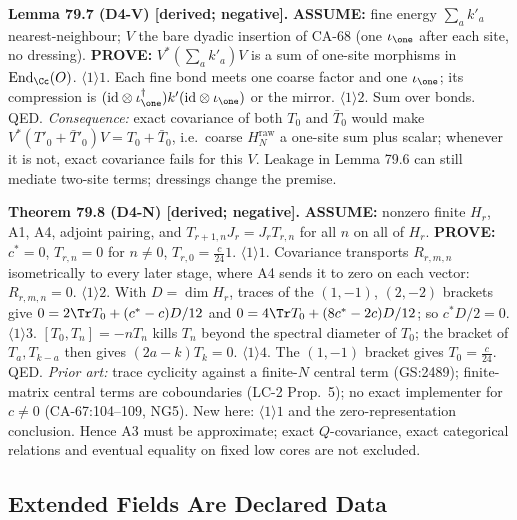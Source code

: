 \textbf{Lemma 79.7 (D4-V) [derived; negative].}  \textbf{ASSUME:} fine energy
\(\sum_ak'_a\) nearest-neighbour; \(V\) the bare dyadic insertion of CA-68 (one \(\iota_\one\) after each
site, no dressing).  \textbf{PROVE:} \(V^*(\sum_ak'_a)V\) is a sum of one-site morphisms in
\(\operatorname{End}_\Cc(O)\).  \(\langle1\rangle1\). Each fine bond meets one coarse factor and one
\(\iota_\one\); its compression is \((\mathrm{id}\otimes\iota_\one^\dagger)k'(\mathrm{id}\otimes\iota_\one)\) or
the mirror.  \(\langle1\rangle2\). Sum over bonds.  QED.  \emph{Consequence:} exact covariance of both
\(T_0\) and \(\bar T_0\) would make \(V^*(T'_0+\bar T'_0)V=T_0+\bar T_0\), i.e.\ coarse \(H^{\mathrm{raw}}_N\)
a one-site sum plus scalar; whenever it is not, exact covariance fails for this \(V\).
Leakage in Lemma 79.6 can still mediate two-site terms; dressings change the premise.

\textbf{Theorem 79.8 (D4-N) [derived; negative].}  \textbf{ASSUME:} nonzero finite \(H_r\), A1,
A4, adjoint pairing, and \(T_{r+1,n}J_r=J_rT_{r,n}\) for all \(n\) on all of \(H_r\).
\textbf{PROVE:} \(c^*=0\), \(T_{r,n}=0\) for \(n\ne0\), \(T_{r,0}=\frac c{24}1\).
\(\langle1\rangle1\). Covariance transports \(R_{r,m,n}\) isometrically to every later stage, where A4
sends it to zero on each vector: \(R_{r,m,n}=0\).  \(\langle1\rangle2\). With \(D=\dim H_r\), traces of
the \((1,-1)\), \((2,-2)\) brackets give \(0=2\Tr T_0+(c^*-c)D/12\) and \(0=4\Tr T_0+(8c^*-2c)D/12\);
so \(c^*D/2=0\).  \(\langle1\rangle3\). \([T_0,T_n]=-nT_n\) kills \(T_n\) beyond the spectral diameter
of \(T_0\); the bracket of \(T_a,T_{k-a}\) then gives \((2a-k)T_k=0\).  \(\langle1\rangle4\). The
\((1,-1)\) bracket gives \(T_0=\frac c{24}\).  QED.
\emph{Prior art:} trace cyclicity against a finite-\(N\) central term (GS:2489); finite-matrix
central terms are coboundaries (LC-2 Prop.~5); no exact implementer for \(c\ne0\) (CA-67:104--109,
NG5).  New here: \(\langle1\rangle1\) and the zero-representation conclusion.  Hence A3 must be
approximate; exact \(Q\)-covariance, exact categorical relations and eventual equality on
fixed low cores are not excluded.

\subsection{Extended Fields Are Declared Data}

